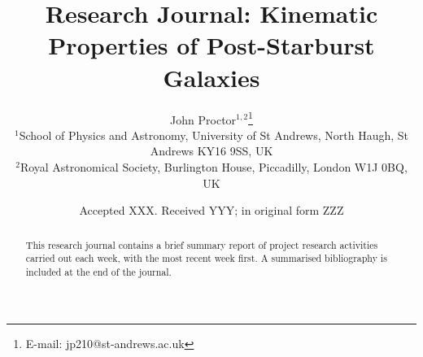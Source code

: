 \documentclass[ceqn,usenatbib,onecolumn]{mnras}
\title[Research Journalt: Kinematics of Post-Starburst Galaxies] {Research Journal: Kinematic Properties of Post-Starburst Galaxies} %
\author[J. Proctor]{John Proctor$^{1,2}$\thanks{E-mail: jp210@st-andrews.ac.uk}
\\
$^{1}$School of Physics and Astronomy, University of St Andrews, North Haugh, St Andrews KY16 9SS, UK\\
$^{2}$Royal Astronomical Society, Burlington House, Piccadilly, London W1J 0BQ, UK\\
}
\date{Accepted XXX. Received YYY; in original form ZZZ}
\begin{document}
\label{firstpage} 
\pagerange{\pageref{firstpage}--\pageref{lastpage}}

\maketitle

\begin{abstract}
    This research journal contains a brief summary report of project research activities carried out each week, with the most recent week first. A summarised bibliography is included at the end of the journal.
\end{abstract}










 
\end{document}

